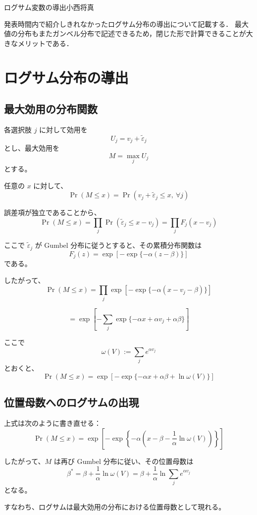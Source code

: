 \clearpage
\begin{column}{ログサム変数の導出}{小西将真}



発表時間内で紹介しきれなかったログサム分布の導出について記載する．
最大値の分布もまたガンベル分布で記述できるため，閉じた形で計算できることが大きなメリットである．


\section{ログサム分布の導出}

\subsection{最大効用の分布関数}

各選択肢 $j$ に対して効用を
\[
U_j = v_j + \tilde{\varepsilon}_j
\]
とし、最大効用を
\[
M = \max_j U_j
\]
とする。

任意の $x$ に対して、
\[
\Pr(M \le x)
=
\Pr(v_j + \tilde{\varepsilon}_j \le x, \ \forall j)
\]

誤差項が独立であることから、
\[
\Pr(M \le x)
=
\prod_j \Pr(\tilde{\varepsilon}_j \le x - v_j)
=
\prod_j F_j(x - v_j)
\]

ここで $\tilde{\varepsilon}_j$ が Gumbel 分布に従うとすると、その累積分布関数は
\[
F_j(z)
=
\exp\left[
-\exp\{-\alpha(z - \beta)\}
\right]
\]
である。

したがって、
\[
\Pr(M \le x)
=
\prod_j
\exp\left[
-\exp\{-\alpha(x - v_j - \beta)\}
\right]
\]

\[
=
\exp\left[
-\sum_j \exp\{-\alpha x + \alpha v_j + \alpha \beta\}
\right]
\]

ここで
\[
\omega(V) := \sum_j e^{\alpha v_j}
\]
とおくと、
\[
\Pr(M \le x)
=
\exp\left[
-\exp\{-\alpha x + \alpha \beta + \ln \omega(V)\}
\right]
\]


\subsection{位置母数へのログサムの出現}

上式は次のように書き直せる：
\[
\Pr(M \le x)
=
\exp\left[
-\exp\left\{
-\alpha \left(
x - \beta - \frac{1}{\alpha} \ln \omega(V)
\right)
\right\}
\right]
\]

したがって、$M$ は再び Gumbel 分布に従い、その位置母数は
\[
\beta^\ast
=
\beta + \frac{1}{\alpha} \ln \omega(V)
=
\beta + \frac{1}{\alpha} \ln \sum_j e^{\alpha v_j}
\]
となる。

すなわち、ログサムは最大効用の分布における位置母数として現れる。


\end{column}
